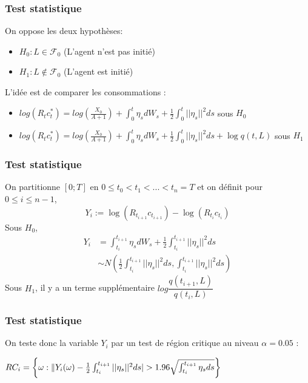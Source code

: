 \documentclass[french]{beamer}
\begin{document}
\begin{frame}
\frametitle{Test statistique}
On oppose les deux hypothèses:
\begin{itemize}
\item $H_{0} : L \in \mathcal{F}_{0}$ (L'agent n'est pas initié)
\item $H_{1} : L \notin \mathcal{F}_{0}$ (L'agent est initié)
\end{itemize}
L'idée est de comparer les consommations : 
\begin{itemize}
\item $log(R_t c^*_t) = log(\frac{X_0}{A+1}) + \int_{0}^{t}\eta_s dW_s + \frac{1}{2} \int_{0}^{t} ||\eta_s||^2 ds$ sous $H_{0}$
\item $log(R_t c^*_t) = log(\frac{X_0}{A+1}) + \int_{0}^{t}\eta_s dW_s + \frac{1}{2} \int_{0}^{t} ||\eta_s||^2 ds + \log q\left(t, L \right)$ sous $H_{1}$
\end{itemize}
\end{frame}

\begin{frame}
\frametitle{Test statistique}
On partitionne $ \left[0; T \right]$ en $0 \leq t_{0} < t_{1} < ... < t_{n} = T$ et on définit pour $0 \leq i \leq n - 1$,
\begin{displaymath}
Y_{i} := \log \left( R_{t_{i + 1}} c_{t_{i + 1}}\right) - \log \left( R_{t_{i}} c_{t_{i}}\right)
\end{displaymath}
Sous $H_{0}$,
\begin{displaymath}
	\begin{split}
	Y_{i} &=  \int_{t_{i}}^{t_{i + 1}}\eta_s dW_s + \frac{1}{2} \int_{t_{i}}^{t_{i + 1}} ||\eta_s||^2 ds \\
		  &\sim N \left(\frac{1}{2} \int_{t_{i}}^{t_{i + 1}} ||\eta_s||^2 ds, \int_{t_{i}}^{t_{i + 1}} ||\eta_s||^2 ds \right)
	\end{split}
\end{displaymath}
Sous $H_{1}$, il y a un terme supplémentaire $log \dfrac{q\left( t_{i + 1}, L\right)}{q\left( t_{i}, L\right)}$
\end{frame}

\begin{frame}
\frametitle{Test statistique}
On teste donc la variable $Y_{i}$ par un test de région critique au niveau $\alpha = 0.05$ : 
	\begin{center}
	$RC_i = \left\lbrace \omega : \large \|Y_i (\omega) - \frac{1}{2}\int_{t_{i}}^{t_{i+1}} ||\eta_s||^2 ds \large| > 1.96 \sqrt{\int_{t_{i}}^{t_{i+1}} \eta_s ds} \right\rbrace$
	\end{center}
\end{frame}
\end{document}
